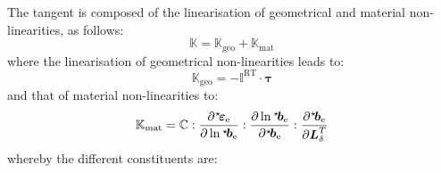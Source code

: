 \documentclass{goose-article}
\newcommand\ST[1]{\hspace*{-.3em}~^\star\!#1}
\newcommand\T[1]{\bm{{#1}}}
\newcommand\TT[1]{\mathbb{{#1}}}
\begin{document}
The tangent is composed of the linearisation of geometrical and material non-linearities, as follows:
\begin{equation}
  \TT{K} = \TT{K}_\mathrm{geo} + \TT{K}_\mathrm{mat}
\end{equation}
where the linearisation of geometrical non-linearities leads to:
\begin{equation}
  \TT{K}_\mathrm{geo} = - \TT{I}^\mathrm{RT} \cdot \T{\tau}
\end{equation}
and that of material non-linearities to:
\begin{equation}
  \TT{K}_\mathrm{mat} = \TT{C} : \frac{\partial \ST{\T{\varepsilon}}_\mathrm{e}}{\partial \ln \ST{\T{b}}_\mathrm{e}} : \frac{\partial \ln \ST{\T{b}}_\mathrm{e}}{\partial \ST{\T{b}}_\mathrm{e}} : \frac{\partial \ST{\T{b}}_\mathrm{e}}{\partial \T{L}_\delta^T}
\end{equation}
whereby the different constituents are:
\end{document}
